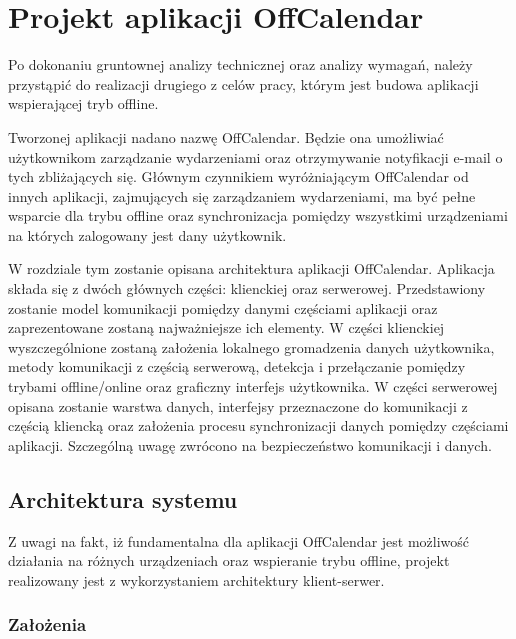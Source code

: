 \chapter{Projekt aplikacji OffCalendar}
\label{cha:proAppOff}

Po dokonaniu gruntownej analizy technicznej oraz analizy wymagań, należy przystąpić do realizacji drugiego z celów pracy, którym jest budowa aplikacji wspierającej tryb offline.

Tworzonej aplikacji nadano nazwę OffCalendar. Będzie ona umożliwiać użytkownikom zarządzanie wydarzeniami oraz otrzymywanie notyfikacji e-mail o tych zbliżających się. Głównym czynnikiem wyróżniającym OffCalendar od innych aplikacji, zajmujących się zarządzaniem wydarzeniami, ma być pełne wsparcie dla trybu offline oraz synchronizacja pomiędzy wszystkimi urządzeniami na których zalogowany jest dany użytkownik.

W rozdziale tym zostanie opisana architektura aplikacji OffCalendar. Aplikacja składa się z dwóch głównych części: klienckiej oraz serwerowej. Przedstawiony zostanie model komunikacji pomiędzy danymi częściami aplikacji oraz zaprezentowane zostaną najważniejsze ich elementy. W części klienckiej wyszczególnione zostaną założenia lokalnego gromadzenia danych użytkownika, metody komunikacji z częścią serwerową, detekcja i przełączanie pomiędzy trybami offline/online oraz graficzny interfejs użytkownika. W części serwerowej opisana zostanie warstwa danych, interfejsy przeznaczone do komunikacji z częścią kliencką oraz założenia procesu synchronizacji danych pomiędzy częściami aplikacji. Szczególną uwagę zwrócono na bezpieczeństwo komunikacji i danych.


\section{Architektura systemu}
\label{sec:archSys}

Z uwagi na fakt, iż fundamentalna dla aplikacji OffCalendar jest możliwość działania na różnych urządzeniach oraz wspieranie trybu offline, projekt realizowany jest z wykorzystaniem architektury klient-serwer.

\subsection{Założenia}
\label{sec:zalozenia}

